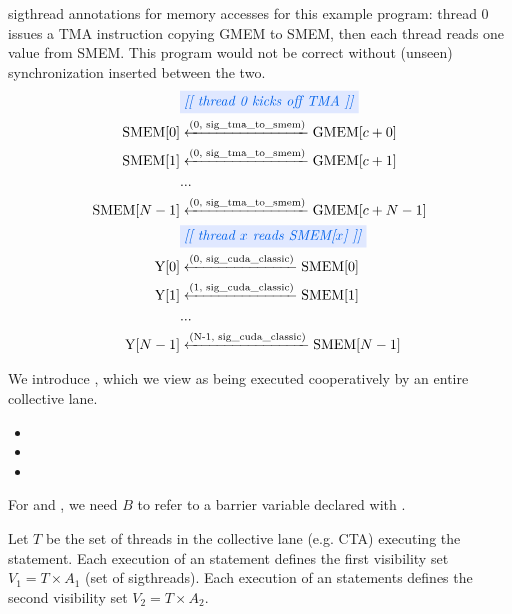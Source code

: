\filbreak
{} sigthread annotations for memory accesses for this example program: thread 0 issues a TMA instruction copying \textsf{GMEM} to \textsf{SMEM}, then each thread reads one value from \textsf{SMEM}.
This program would not be correct without (unseen) synchronization inserted between the two.
{\sffamily
\begin{align*}
    & \blueBox{\textit{[[ thread 0 kicks off TMA ]]}} \\
    \text{SMEM[$0$]} & \xleftarrow{\text{(0, sig\_tma\_to\_smem)}} \text{GMEM[$c+0$]} \\
    \text{SMEM[$1$]} & \xleftarrow{\text{(0, sig\_tma\_to\_smem)}} \text{GMEM[$c+1$]} \\
    & ... \\
    \text{SMEM[$N-1$]} & \xleftarrow{\text{(0, sig\_tma\_to\_smem)}} \text{GMEM[$c+N-1$]} \\
    & \blueBox{\textit{[[ thread $x$ reads SMEM[$x$] ]]}} \\
    \text{Y[$0$]} & \xleftarrow{\text{(0, sig\_cuda\_classic)}} \text{SMEM[$0$]} \\
    \text{Y[$1$]} & \xleftarrow{\text{(1, sig\_cuda\_classic)}} \text{SMEM[$1$]} \\
    & ... \\
    \text{Y[$N-1$]} & \xleftarrow{\text{(N-1, sig\_cuda\_classic)}} \text{SMEM[$N-1$]} \\
\end{align*}
}

\filbreak
{}

We introduce , which we view as being executed cooperatively by an entire collective lane.

\filbreak
\begin{itemize}
  \item {}
  \item {}
  \item {}
\end{itemize}

\filbreak
For  and , we need $B$ to refer to a barrier variable declared with .

\filbreak
Let $T$ be the set of threads in the collective lane (e.g. CTA) executing the statement.
Each execution of an  statement defines the first visibility set $V_1 = T \times A_1$ (set of sigthreads).
Each execution of an  statements defines the second visibility set $V_2 = T \times A_2$.

